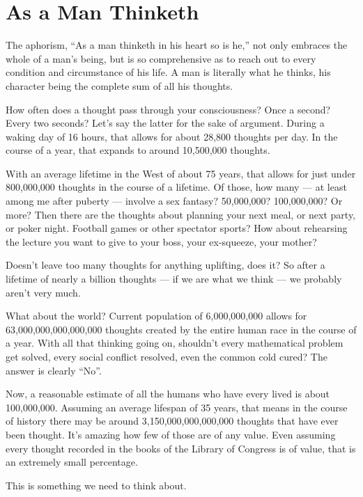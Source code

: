\section{As a Man Thinketh}

\begin{quotex}
The aphorism, ``As a man thinketh in his heart so is he,'' not only embraces the whole of a man's being, but is so comprehensive as to reach out to every condition and circumstance of his life. A man is literally what he thinks, his character being the complete sum of all his thoughts.
\end{quotex}


How often does a thought pass through your consciousness? Once a second? Every two seconds? Let's say the latter for the sake of argument. During a waking day of 16 hours, that allows for about 28,800 thoughts per day. In the course of a year, that expands to around 10,500,000 thoughts.

With an average lifetime in the West of about 75 years, that allows for just under 800,000,000 thoughts in the course of a lifetime. Of those, how many --- at least among me after puberty --- involve a sex fantasy? 50,000,000? 100,000,000? Or more? Then there are the thoughts about planning your next meal, or next party, or poker night. Football games or other spectator sports? How about rehearsing the lecture you want to give to your boss, your ex-squeeze, your mother?

Doesn't leave too many thoughts for anything uplifting, does it? So after a lifetime of nearly a billion thoughts --- if we are what we think --- we probably aren't very much.

What about the world? Current population of 6,000,000,000 allows for 63,000,000,000,000,000 thoughts created by the entire human race in the course of a year. With all that thinking going on, shouldn't every mathematical problem get solved, every social conflict resolved, even the common cold cured? The answer is clearly ``No''.

Now, a reasonable estimate of all the humans who have every lived is about 100,000,000. Assuming an average lifespan of 35 years, that means in the course of history there may be around 3,150,000,000,000,000 thoughts that have ever been thought. It's amazing how few of those are of any value. Even assuming every thought recorded in the books of the Library of Congress is of value, that is an extremely small percentage.

This is something we need to think about.



